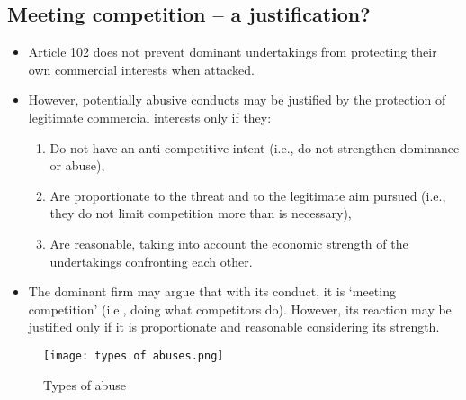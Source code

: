     \subsection{Meeting competition – a justification?}

        \begin{itemize}
            \item Article 102 does not prevent dominant undertakings from protecting their own commercial interests when attacked.
            \item However, potentially abusive conducts may be justified by the protection of legitimate commercial interests only if they:
            \begin{enumerate}
                \item Do not have an anti-competitive intent (i.e., do not strengthen dominance or abuse),
                \item Are proportionate to the threat and to the legitimate aim pursued (i.e., they do not limit competition more than is necessary),
                \item Are reasonable, taking into account the economic strength of the undertakings confronting each other.
            \end{enumerate}
            \item The dominant firm may argue that with its conduct, it is ‘meeting competition’ (i.e., doing what competitors do). However, its reaction may be justified only if it is proportionate and reasonable considering its strength.
        \end{itemize}

    \begin{center}
        \begin{figure}[h]
            \centering
            \texttt{[image: types of abuses.png]}
            \caption{Types of abuse}
        \end{figure}
    \end{center}

